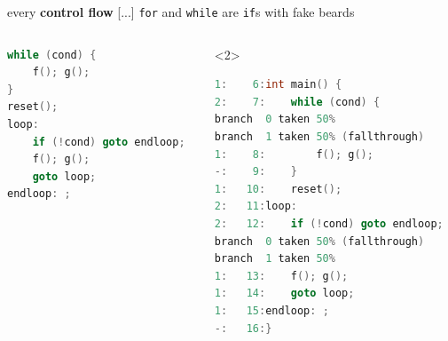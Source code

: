 \documentclass[xcolor = {dvipsnames, table}, aspectratio=169]{beamer}
\begin{document}
\begin{frame}[fragile]
    \begin{block}{every \textbf{control flow} [...]}
        \lstinline{for} and \lstinline{while} are \lstinline{if}s with fake
        beards
    \end{block}

    \begin{columns}
        \begin{column}{0.5\textwidth}
            \begin{lstlisting}[language = C, basicstyle = \scriptsize\ttfamily]
while (cond) {
    f(); g();
}
reset();
loop:
    if (!cond) goto endloop;
    f(); g();
    goto loop;
endloop: ;
            \end{lstlisting}
        \end{column}

        \begin{column}{0.5\textwidth}
            \begin{visibleenv}<2>
                \begin{lstlisting}[language = C, basicstyle = \tiny\ttfamily]
1:    6:int main() {
2:    7:    while (cond) {
branch  0 taken 50%
branch  1 taken 50% (fallthrough)
1:    8:        f(); g();
-:    9:    }
1:   10:    reset();
2:   11:loop:
2:   12:    if (!cond) goto endloop;
branch  0 taken 50% (fallthrough)
branch  1 taken 50%
1:   13:    f(); g();
1:   14:    goto loop;
1:   15:endloop: ;
-:   16:}
                \end{lstlisting}
            \end{visibleenv}
        \end{column}
    \end{columns}
\end{frame}
\end{document}
